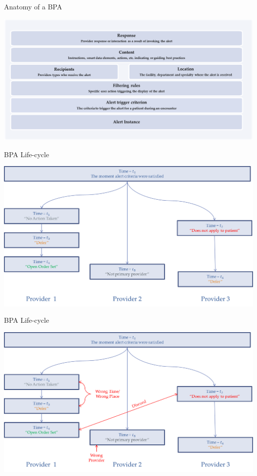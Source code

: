 \documentclass[10pt]{beamer}
\begin{document}
\begin{frame}{Anatomy of a BPA}
	\begin{center}
		\includegraphics[width=1.2\textwidth, center, trim=-1cm -1cm -1cm -1cm]{images/alert_anatomy.png}
	\end{center}
\end{frame}

\begin{frame}{BPA Life-cycle}
	\begin{center}
		\includegraphics[width=1.2\textwidth, center, trim=-1cm -1cm -1cm -1cm]{images/BPA_lifecycle.png}
	\end{center}
\end{frame}

\begin{frame}{BPA Life-cycle}
	\begin{center}
		\includegraphics[width=1.2\textwidth, center, trim=-1cm -1cm -1cm -1cm]{images/BPA_lifecycle_2.png}
	\end{center}
\end{frame}
\end{document}
